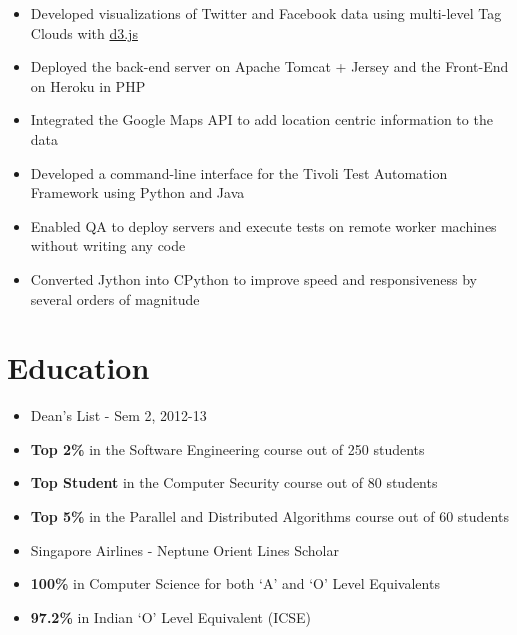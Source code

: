 \documentclass[11pt,a4paper]{moderncv}
\begin{document}
{\begin{itemize}
        \item Developed visualizations of Twitter and Facebook data using multi-level Tag Clouds with \href{http://d3js.org/}{d3.js}
        \item Deployed the back-end server on Apache Tomcat + Jersey and the Front-End on Heroku in PHP
        \item Integrated the Google Maps API to add location centric information to the data
 \end{itemize}}

{\begin{itemize}
        \item Developed a command-line interface for the Tivoli Test Automation Framework using Python and Java
        \item Enabled QA to deploy servers and execute tests on remote worker machines without writing any code
        \item Converted Jython into CPython to improve speed and responsiveness by several orders of magnitude
 \end{itemize}}
\section{Education}
{\begin{itemize}
    \item Dean's List - Sem 2, 2012-13
    \item \textbf{Top 2\%} in the Software Engineering course out of 250 students
    \item \textbf{Top Student} in the Computer Security course out of 80 students
    \item \textbf{Top 5\%} in the Parallel and Distributed Algorithms course out of 60 students
    \item Singapore Airlines - Neptune Orient Lines Scholar
 \end{itemize}}
{\begin{itemize}
            \item \textbf{100\%} in Computer Science for both `A' and `O' Level Equivalents
            \item \textbf{97.2\%} in Indian `O' Level Equivalent (ICSE)
 \end{itemize}}
\end{document}
